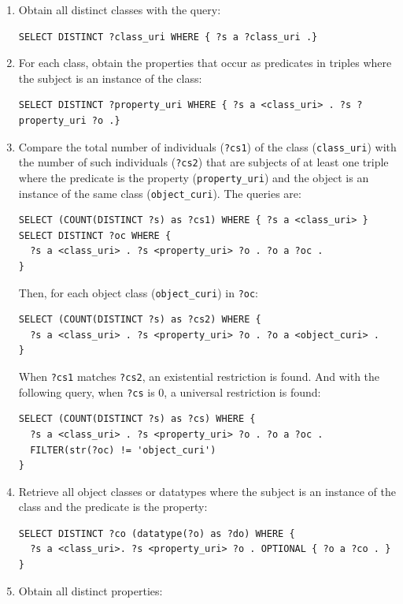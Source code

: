 \documentclass[data,datadescriptor,submit,moreauthors,pdftex]{Definitions/mdpi}
\newcommand{\te}[1] {\texttt{\footnotesize#1}}
\begin{document}
\begin{enumerate}
    \item Obtain all distinct classes with the query:
\begin{lstlisting}[language=spq]
SELECT DISTINCT ?class_uri WHERE { ?s a ?class_uri .}
\end{lstlisting}
\item For each class, obtain the properties that occur as predicates in triples where the subject is an instance of the class:
\begin{lstlisting}[language=spq]
SELECT DISTINCT ?property_uri WHERE { ?s a <class_uri> . ?s ?property_uri ?o .}
\end{lstlisting}
\item Compare the total number of individuals (\te{?cs1}) of the class (\te{class\_uri}) with
	the number of such individuals (\te{?cs2}) that are subjects of at least one triple where 
        the predicate is the property (\te{property\_uri}) and the object is
        an instance of the same class (\te{object\_curi}).
	The queries are:
\begin{lstlisting}[language=spq]
SELECT (COUNT(DISTINCT ?s) as ?cs1) WHERE { ?s a <class_uri> }
SELECT DISTINCT ?oc WHERE {
  ?s a <class_uri> . ?s <property_uri> ?o . ?o a ?oc .
}
\end{lstlisting}
        Then, for each object class (\te{object\_curi}) in \te{?oc}:
\begin{lstlisting}[language=spq]
SELECT (COUNT(DISTINCT ?s) as ?cs2) WHERE {
  ?s a <class_uri> . ?s <property_uri> ?o . ?o a <object_curi> .
}
\end{lstlisting}
        When \te{?cs1} matches \te{?cs2}, an existential restriction is found.
        And with the following query, when \te{?cs} is 0, a universal restriction is found:
\begin{lstlisting}[language=spq]
SELECT (COUNT(DISTINCT ?s) as ?cs) WHERE {
  ?s a <class_uri> . ?s <property_uri> ?o . ?o a ?oc .
  FILTER(str(?oc) != 'object_curi')
}
\end{lstlisting}
  \item Retrieve all object classes or datatypes where the subject is an instance of the class and the predicate is the property:
\begin{lstlisting}[language=spq]
SELECT DISTINCT ?co (datatype(?o) as ?do) WHERE {
  ?s a <class_uri>. ?s <property_uri> ?o . OPTIONAL { ?o a ?co . }
}
\end{lstlisting}
  \item Obtain all distinct properties:

\end{enumerate}
\end{document}
